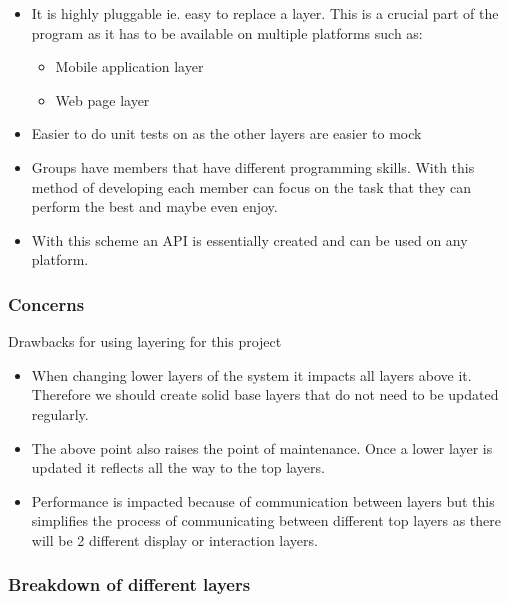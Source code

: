 \documentclass[a4paper,12pt]{report}
\begin{document}
\begin{itemize}
	\item It is highly pluggable ie. easy to replace a layer. This is a crucial part of the program as it has to be available on multiple platforms such as:
	\begin{itemize}
		\item Mobile application layer
		\item Web page layer
	\end{itemize}
	\item Easier to do unit tests on as the other layers are easier to mock
	\item Groups have members that have different programming skills. With this method of developing each member can focus on the task that they can perform the best and maybe even enjoy.
	\item With this scheme an API is essentially created and can be used on any platform. 
\end{itemize}

\subsubsection{Concerns}
Drawbacks for using layering for this project

\begin{itemize}
	\item When changing lower layers of the system it impacts all layers above it. Therefore we should create solid base layers that do not need to be updated regularly.
	\item The above point also raises the point of maintenance. Once a lower layer is updated it reflects all the way to the top layers.
	\item Performance is impacted because of communication between layers but this simplifies the process of communicating between different top layers as there will be 2 different display or interaction layers.
\end{itemize}

\subsubsection{Breakdown of different layers}
\end{document}

